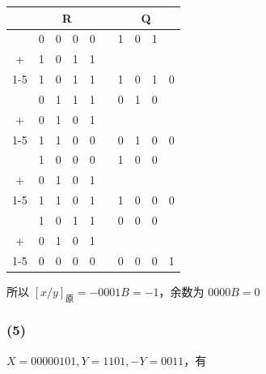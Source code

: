 \documentclass[12pt, a4paper]{ctexart}
\begin{document}
\begin{table}[H]
    \centering
    \begin{tabular}{cccccccccc}
        \hline
        & \multicolumn{4}{c}{R} && \multicolumn{4}{c}{Q} \\
        \hline
          & 0&0&0&0 && 1&0&\multicolumn{1}{c|}{1}   \\ \hdashline
        + & 1&0&1&1 && \multicolumn{3}{c|}{}        \\ \cline{1-5}
          & 1&0&1&1 && 1&0&\multicolumn{1}{c|}{1}&0 \\ \hdashline
          & 0&1&1&1 && 0&\multicolumn{1}{c|}{1}&0   \\
        + & 0&1&0&1 && \multicolumn{2}{c|}{}        \\ \cline{1-5}
          & 1&1&0&0 && 0&\multicolumn{1}{c|}{1}&0&0 \\ \hdashline
          & 1&0&0&0 && \multicolumn{1}{c|}{1}&0&0   \\
        + & 0&1&0&1 && \multicolumn{1}{c|}{}        \\ \cline{1-5}
          & 1&1&0&1 && \multicolumn{1}{c|}{1}&0&0&0 \\ \hdashline
          & 1&0&1&1 &\multicolumn{1}{c|}{}& 0&0&0   \\
        + & 0&1&0&1 &\multicolumn{1}{c|}{}          \\ \cline{1-5}
          & 0&0&0&0 &\multicolumn{1}{c|}{}& 0&0&0&1 \\ \hline
    \end{tabular}
\end{table}

所以 $\left[x/y\right]_\text{原}=-0001B=-1$，余数为 $0000B=0$

\subsubsection*{(5)}

$X=00000101,Y=1101,-Y=0011$，有
\end{document}
